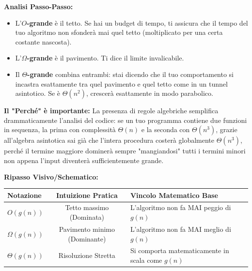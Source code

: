 \documentclass[a4paper, 11pt]{report}
\begin{document}
\textbf{Analisi Passo-Passo:}
\begin{itemize}
\item L'\textbf{$O$-grande} è il tetto. Se hai un budget di tempo, ti assicura che il tempo del tuo algoritmo non sfonderà mai quel tetto (moltiplicato per una certa costante nascosta).
\item L'\textbf{$\Omega$-grande} è il pavimento. Ti dice il limite invalicabile.
\item Il \textbf{$\Theta$-grande} combina entrambi: stai dicendo che il tuo comportamento si incastra esattamente tra quel pavimento e quel tetto come in un tunnel asintotico. Se è $\Theta(n^2)$, crescerà esattamente in modo parabolico.
\end{itemize}

\textbf{Il "Perché" è importante:}
La presenza di regole algebriche semplifica drammaticamente l'analisi del codice: se un tuo programma contiene due funzioni in sequenza, la prima con complessità $\Theta(n)$ e la seconda con $\Theta(n^3)$, grazie all'algebra asintotica sai già che l'intera procedura costerà globalmente $\Theta(n^3)$, perché il termine maggiore dominerà sempre "mangiandosi" tutti i termini minori non appena l'input diventerà sufficientemente grande.

\textbf{Ripasso Visivo/Schematico:}
\begin{center}
\begin{tabular}{|l|c|p{8cm}|}
\hline
\textbf{Notazione} & \textbf{Intuizione Pratica} & \textbf{Vincolo Matematico Base} \\
\hline
$O(g(n))$ & Tetto massimo (Dominata) & L'algoritmo non fa MAI peggio di $g(n)$ \\
\hline
$\Omega(g(n))$ & Pavimento minimo (Dominante) & L'algoritmo non fa MAI meglio di $g(n)$ \\
\hline
$\Theta(g(n))$ & Risoluzione Stretta & Si comporta matematicamente in scala come $g(n)$ \\
\hline
\end{tabular}
\end{center}
\end{document}
